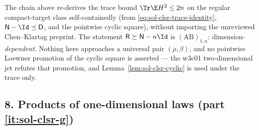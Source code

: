 \documentclass[../main.tex]{subfiles}
\begin{document}
\begin{remark}
The chain above re-derives the trace bound $\Tr\E H^2\le2n$ on the regular compact-target
class self-containedly (from \eqref{eq:sol-clsr-trace-identity},
$\mathsf N-\Id\preceq\mathsf D$, and the pointwise cyclic square), without importing the
unreviewed Chen--Klartag preprint.  The statement $\mathsf R\succeq\mathsf N-n\Id$ is
$(\mathrm{AB})_{1,n}$: dimension-\emph{dependent}.  Nothing here approaches a universal pair
$(\rho,\beta)$, and no pointwise Loewner promotion of the cyclic square is asserted --- the
w3c01 two-dimensional jet refutes that promotion, and Lemma~\ref{lem:sol-clsr-cyclic} is used
under the trace only.
\end{remark}

\subsection*{8. Products of one-dimensional laws (part \ref{it:sol-clsr-g})}
\end{document}
